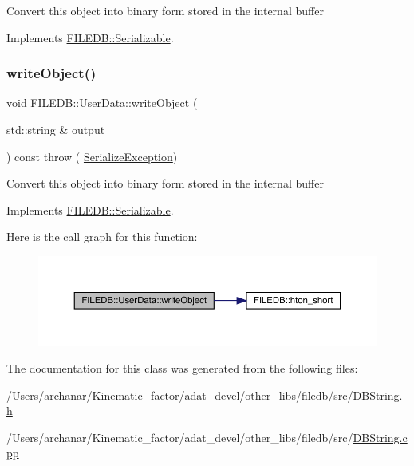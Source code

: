 Convert this object into binary form stored in the internal buffer 

Implements \mbox{\hyperlink{classFILEDB_1_1Serializable_a8deaa86e108c08c863881e46cf5578ea}{F\+I\+L\+E\+D\+B\+::\+Serializable}}.

\mbox{\label{classFILEDB_1_1UserData_a42b5e25b3cba7274363590c5b6861795}} 
\subsubsection{\texorpdfstring{writeObject()}{writeObject()}\hspace{0.1cm}{\footnotesize\ttfamily [2/2]}}
{\footnotesize\ttfamily void F\+I\+L\+E\+D\+B\+::\+User\+Data\+::write\+Object (\begin{DoxyParamCaption}\item[{std\+::string \&}]{output }\end{DoxyParamCaption}) const throw ( \mbox{\hyperlink{classFILEDB_1_1SerializeException}{Serialize\+Exception}}) \hspace{0.3cm}{\ttfamily [virtual]}}

Convert this object into binary form stored in the internal buffer 

Implements \mbox{\hyperlink{classFILEDB_1_1Serializable_a8deaa86e108c08c863881e46cf5578ea}{F\+I\+L\+E\+D\+B\+::\+Serializable}}.

Here is the call graph for this function\+:\nopagebreak
\begin{figure}[H]
\begin{center}
\leavevmode
\includegraphics[width=350pt]{dc/d12/classFILEDB_1_1UserData_a42b5e25b3cba7274363590c5b6861795_cgraph}
\end{center}
\end{figure}


The documentation for this class was generated from the following files\+:\begin{DoxyCompactItemize}
\item 
/\+Users/archanar/\+Kinematic\+\_\+factor/adat\+\_\+devel/other\+\_\+libs/filedb/src/\mbox{\hyperlink{other__libs_2filedb_2src_2DBString_8h}{D\+B\+String.\+h}}\item 
/\+Users/archanar/\+Kinematic\+\_\+factor/adat\+\_\+devel/other\+\_\+libs/filedb/src/\mbox{\hyperlink{DBString_8cpp}{D\+B\+String.\+cpp}}\end{DoxyCompactItemize}
